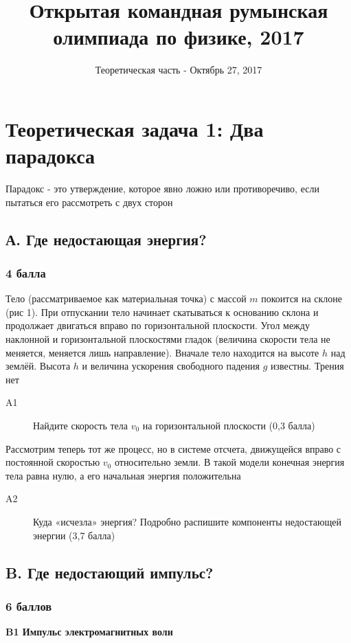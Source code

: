\documentclass[a4paper, 14pt]{article}
\title{Открытая командная румынская олимпиада по физике, 2017}
\date{Теоретическая часть - Октябрь 27, 2017}
\begin{document}
    \maketitle

    \section*{Теоретическая задача 1: Два парадокса}
    Парадокс - это утверждение, которое явно ложно или противоречиво, если пытаться его рассмотреть с двух сторон
    \subsection*{А. Где недостающая энергия?}
    \subsubsection*{4 балла}
    Тело (рассматриваемое как материальная точка) с массой $m$ покоится на склоне (рис 1).
    При отпускании тело начинает скатываться к основанию склона и продолжает двигаться вправо по горизонтальной
    плоскости.
    Угол между наклонной и горизонтальной плоскостями гладок (величина скорости тела не меняется, меняется лишь
    направление).
    Вначале тело находится на высоте $h$ над землёй.
    Высота $h$ и величина ускорения свободного падения $g$ известны.
    Трения нет

    \begin{description}
        \item [A1]
        Найдите скорость тела $v_0$ на горизонтальной плоскости (0,3 балла)
    \end{description}

    Рассмотрим теперь тот же процесс, но в системе отсчета, движущейся вправо с постоянной скоростью $v_0$
    относительно земли.
    В такой модели конечная энергия тела равна нулю, а его начальная энергия положительна

    \begin{description}
        \item [A2] Куда «исчезла» энергия?
        Подробно распишите компоненты недостающей энергии (3,7 балла)
    \end{description}

    \subsection*{B. Где недостающий импульс?}
    \subsubsection*{6 баллов}
    \textbf{B1 Импульс электромагнитных волн}
\end{document}
